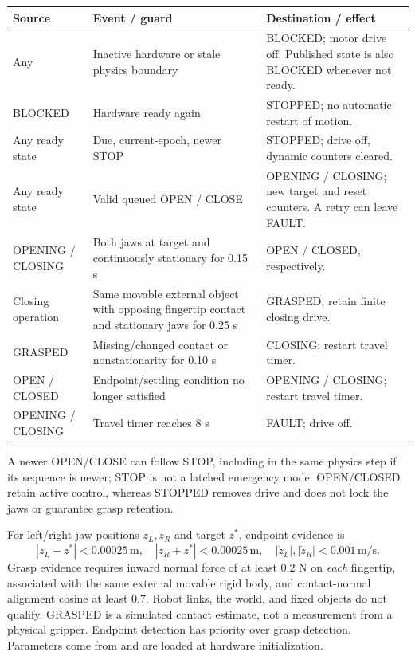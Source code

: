 \documentclass[11pt,a4paper]{report}
\newcommand{\id}[1]{\texttt{\small\detokenize{#1}}}
\begin{document}
\begin{longtable}{L{.28\linewidth}L{.37\linewidth}L{.28\linewidth}}
\toprule Source & Event / guard & Destination / effect \\\midrule\endhead
Any & Inactive hardware or stale physics boundary & BLOCKED; motor drive off. Published state is also BLOCKED whenever not ready. \\
BLOCKED & Hardware ready again & STOPPED; no automatic restart of motion. \\
Any ready state & Due, current-epoch, newer STOP & STOPPED; drive off, dynamic counters cleared. \\
Any ready state & Valid queued OPEN / CLOSE & OPENING / CLOSING; new target and reset counters. A retry can leave FAULT. \\
OPENING / CLOSING & Both jaws at target and continuously stationary for 0.15 s & OPEN / CLOSED, respectively. \\
Closing operation & Same movable external object with opposing fingertip contact and stationary jaws for 0.25 s & GRASPED; retain finite closing drive. \\
GRASPED & Missing/changed contact or nonstationarity for 0.10 s & CLOSING; restart travel timer. \\
OPEN / CLOSED & Endpoint/settling condition no longer satisfied & OPENING / CLOSING; restart travel timer. \\
OPENING / CLOSING & Travel timer reaches 8 s & FAULT; drive off. \\
\bottomrule
\end{longtable}
A newer OPEN/CLOSE can follow STOP, including in the same physics step if its sequence is newer; STOP is not a latched emergency mode. OPEN/CLOSED retain active control, whereas STOPPED removes drive and does not lock the jaws or guarantee grasp retention.

For left/right jaw positions $z_L,z_R$ and target $z^*$, endpoint evidence is
\begin{equation}
 |z_L-z^*|<0.00025\,\mathrm{m},\quad
 |z_R+z^*|<0.00025\,\mathrm{m},\quad
 |\dot z_L|,|\dot z_R|<0.001\,\mathrm{m/s}.
\end{equation}
Grasp evidence requires inward normal force of at least 0.2 N on \emph{each} fingertip, associated with the same external movable rigid body, and contact-normal alignment cosine at least 0.7. Robot links, the world, and fixed objects do not qualify. GRASPED is a simulated contact estimate, not a measurement from a physical gripper. Endpoint detection has priority over grasp detection. Parameters come from \id{gripper.yaml} and are loaded at hardware initialization.
\end{document}
